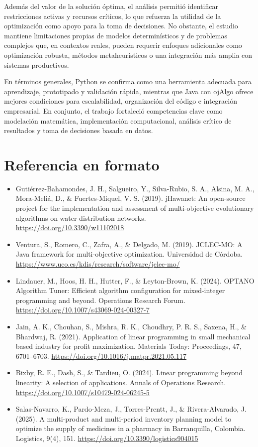\documentclass[12pt,a4paper]{article}
\begin{document}
Además del valor de la solución óptima, el análisis permitió identificar restricciones activas y recursos críticos, lo que refuerza la utilidad de la optimización como apoyo para la toma de decisiones. No obstante, el estudio mantiene limitaciones propias de modelos determinísticos y de problemas complejos que, en contextos reales, pueden requerir enfoques adicionales como optimización robusta, métodos metaheurísticos o una integración más amplia con sistemas productivos.

En términos generales, Python se confirma como una herramienta adecuada para aprendizaje, prototipado y validación rápida, mientras que Java con ojAlgo ofrece mejores condiciones para escalabilidad, organización del código e integración empresarial. En conjunto, el trabajo fortaleció competencias clave como modelación matemática, implementación computacional, análisis crítico de resultados y toma de decisiones basada en datos.

\section{Referencia en formato}

\begin{itemize}[leftmargin=*]
	\item Gutiérrez-Bahamondes, J. H., Salgueiro, Y., Silva-Rubio, S. A., Alsina, M. A., Mora-Meliá, D., \& Fuertes-Miquel, V. S. (2019). jHawanet: An open-source project for the implementation and assessment of multi-objective evolutionary algorithms on water distribution networks. \url{https://doi.org/10.3390/w11102018}
	\item Ventura, S., Romero, C., Zafra, A., \& Delgado, M. (2019). JCLEC-MO: A Java framework for multi-objective optimization. Universidad de Córdoba. \url{https://www.uco.es/kdis/research/software/jclec-mo/}
	\item Lindauer, M., Hoos, H. H., Hutter, F., \& Leyton-Brown, K. (2024). OPTANO Algorithm Tuner: Efficient algorithm configuration for mixed-integer programming and beyond. Operations Research Forum. \url{https://doi.org/10.1007/s43069-024-00327-7}
	\item Jain, A. K., Chouhan, S., Mishra, R. K., Choudhry, P. R. S., Saxena, H., \& Bhardwaj, R. (2021). Application of linear programming in small mechanical based industry for profit maximization. Materials Today: Proceedings, 47, 6701--6703. \url{https://doi.org/10.1016/j.matpr.2021.05.117}
	\item Bixby, R. E., Dash, S., \& Tardieu, O. (2024). Linear programming beyond linearity: A selection of applications. Annals of Operations Research. \url{https://doi.org/10.1007/s10479-024-06245-5}
	\item Salas-Navarro, K., Pardo-Meza, J., Torres-Prentt, J., \& Rivera-Alvarado, J. (2025). A multi-product and multi-period inventory planning model to optimize the supply of medicines in a pharmacy in Barranquilla, Colombia. Logistics, 9(4), 151. \url{https://doi.org/10.3390/logistics904015}
\end{itemize}
\end{document}
